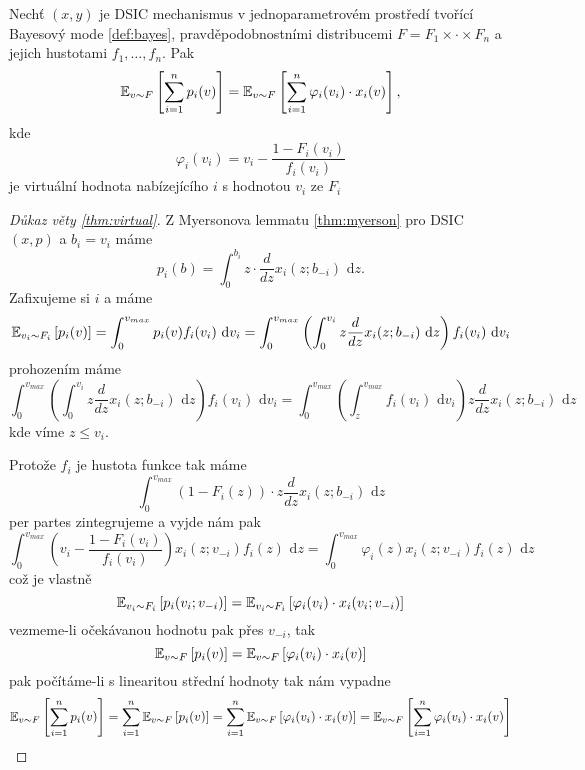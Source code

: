 \begin{theorem}\label{thm:virtual}
    Nechť $(x,y)$ je DSIC mechanismus v jednoparametrovém prostředí tvořící Bayesový mode \ref{def:bayes}, pravděpodobnostními distribucemi $F = F_1\times \cdot \times F_n$ a jejich hustotami $f_1, \dots,f_n$. 
    Pak 
    \[
        \E[v\sim F]{\sum^n_{i=1} p_i(v)} = \E[v\sim F]{\sum^n_{i=1} \varphi_i(v_i) \cdot x_i(v)},  
    \]
    kde  
    \[
        \varphi_i(v_i) = v_i - \frac{1-F_i(v_i)}{f_i(v_i)}
    \]
    je virtuální hodnota nabízejícího $i$ s hodnotou $v_i$ ze $F_i$
\end{theorem}
\begin{proof}[Důkaz věty \ref{thm:virtual}]
    Z Myersonova lemmatu \ref{thm:myerson} pro DSIC $(x,p)$ a $b_i = v_i$ máme 
    \[
        p_i(b) = \int^{b_i}_0 z \cdot \frac{d}{dz} x_i(z;b_{-i}) \text{ d}z. 
    \]
    Zafixujeme si $i$ a máme 
    \[
        \E[v_i\sim F_i]{p_i(v)} = \int^{v_{max}}_0 p_i(v)f_i(v_i) \text{ d}v_i = \int^{v_{max}}_0 \left( \int_0^{v_i} z \frac{d}{dz} x_i(z;b_{-i}) \text{ d}z \right)f_i(v_i) \text{ d}v_i
    \]
    prohozením máme 
    \[
    \int^{v_{max}}_0 \left( \int_0^{v_i} z \frac{d}{dz} x_i(z;b_{-i}) \text{ d}z \right)f_i(v_i) \text{ d}v_i = \int^{v_{max}}_0 \left( \int_z^{v_{max}} f_i(v_i) \text{ d}v_i \right) z \frac{d}{dz} x_i(z;b_{-i}) \text{ d}z
    \]
    kde víme $z \leq v_i$. 

    Protože $f_i$ je hustota funkce tak máme 
    \[
         \int^{v_{max}}_0 \left( 1- F_i(z) \right) \cdot z \frac{d}{dz} x_i(z;b_{-i}) \text{ d}z
    \]
    per partes zintegrujeme a vyjde nám pak 
    \[
        \int_0^{v_{max}} \left( v_i - \frac{1-F_i(v_i)}{f_i(v_i)} \right) x_i(z;v_{-i})f_i(z) \text{ d}z = \int_0^{v_{max}} \varphi_i(z) x_i(z;v_{-i})f_i(z) \text{ d}z
    \]
    což je vlastně 
    \[
        \E[v_i \sim F_i]{p_i(v_i;v_{-i})} = \E[v_i \sim F_i]{\varphi_i(v_i) \cdot x_i(v_i;v_{-i})}
    \] 
    vezmeme-li očekávanou hodnotu pak přes $v_{-i}$, tak 
    \[
        \E[v \sim F]{p_i(v)} = \E[v \sim F]{ \varphi_i(v_i) \cdot x_i(v)}
    \]
    pak počítáme-li s linearitou střední hodnoty tak nám vypadne 
    \[
        \E[v \sim F]{\sum^n_{i=1}p_i(v)} = \sum^n_{i=1} \E[v \sim F]{p_i(v)} = \sum^n_{i=1} \E[v \sim F]{\varphi_i(v_i) \cdot x_i(v)} = \E[v \sim F]{\sum^n_{i=1} \varphi_i(v_i) \cdot x_i(v)}
    \]
\end{proof}

